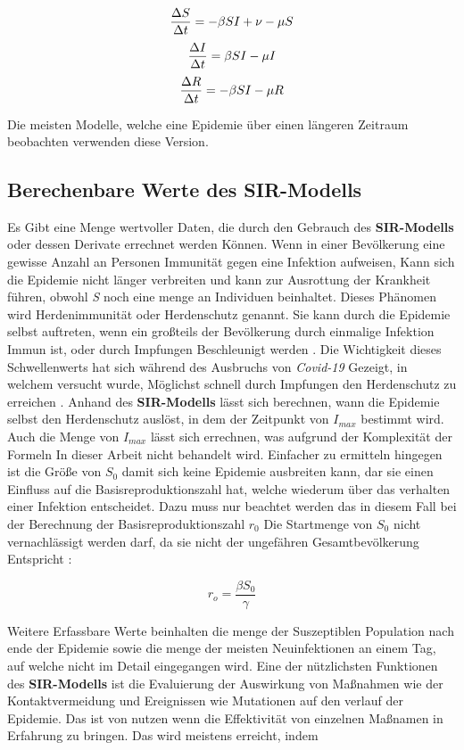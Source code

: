 \documentclass[12pt]{scrartcl} %
\begin{document}
$$ \frac{\Delta S}{\Delta t} = -\beta\space S I + \nu - \mu S $$
$$ \frac{\Delta I}{\Delta t} = \beta\space S I - \mu I $$
$$ \frac{\Delta R}{\Delta t} = -\beta\space S I - \mu R $$

Die meisten Modelle, welche eine Epidemie über einen längeren Zeitraum beobachten verwenden diese Version.


\subsection{Berechenbare Werte des SIR-Modells}

Es Gibt eine Menge wertvoller Daten, die durch den Gebrauch des \textbf{SIR-Modells} oder dessen Derivate errechnet werden Können.
Wenn in einer Bevölkerung eine gewisse Anzahl an Personen Immunität gegen eine Infektion aufweisen, Kann sich die Epidemie nicht länger verbreiten und kann zur Ausrottung der Krankheit führen, obwohl \textsl{S} noch eine menge an Individuen beinhaltet. Dieses Phänomen wird Herdenimmunität oder Herdenschutz genannt. Sie kann durch die Epidemie selbst auftreten, wenn ein großteils der Bevölkerung durch einmalige Infektion Immun ist, oder durch Impfungen Beschleunigt werden \cite{3}. Die Wichtigkeit dieses Schwellenwerts hat sich während des Ausbruchs von \textsl{Covid-19} Gezeigt, in welchem versucht wurde, Möglichst schnell durch Impfungen den Herdenschutz zu erreichen \cite{10}. Anhand des \textbf{SIR-Modells} lässt sich berechnen, wann die Epidemie selbst den Herdenschutz auslöst, in dem der Zeitpunkt von $ \textit{I}_{max} $ bestimmt wird. Auch die Menge von $ \textit{I}_{max} $ lässt sich errechnen, was aufgrund der Komplexität der Formeln In dieser Arbeit nicht behandelt wird. Einfacher zu ermitteln hingegen ist die Größe von $ \textit{S}_{0} $ damit sich keine Epidemie ausbreiten kann, dar sie einen Einfluss auf die Basisreproduktionszahl hat, welche wiederum über das verhalten einer Infektion entscheidet. 
Dazu muss nur beachtet werden das in diesem Fall bei der Berechnung der Basisreproduktionszahl $\textit{r}_{0} $ Die Startmenge von $ \textit{S}_{0}$ nicht vernachlässigt werden darf, da sie nicht der ungefähren Gesamtbevölkerung Entspricht \cite{7, 10}:

$$ r_{o} = \frac{\beta S_{0}}{\gamma} $$

Weitere Erfassbare Werte beinhalten die menge der Suszeptiblen Population nach ende der Epidemie sowie die menge der meisten Neuinfektionen an einem Tag, auf welche nicht im Detail eingegangen wird. Eine der nützlichsten Funktionen des \textbf{SIR-Modells} ist die Evaluierung der Auswirkung von Maßnahmen wie der Kontaktvermeidung und Ereignissen wie Mutationen auf den verlauf der Epidemie. Das ist von nutzen wenn die Effektivität von einzelnen Maßnamen in Erfahrung zu bringen. Das wird meistens erreicht, indem
\end{document}

